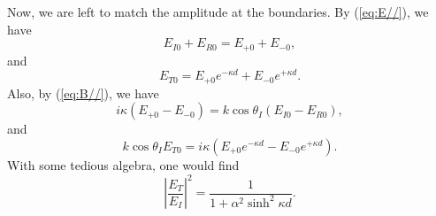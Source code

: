 Now, we are left to match the amplitude at the boundaries. By (\ref{eq:E//}), we have
\begin{equation}
    E_{I0} + E_{R0} = E_{+0} + E_{-0},
\end{equation}
and
\begin{equation}
    E_{T0} =E_{+0}e^{-\kappa d} + E_{-0}e^{+\kappa d}.
\end{equation}
Also, by (\ref{eq:B//}), we have
\begin{equation}
    i\kappa(E_{+0}-E_{-0}) = k\cos\theta_I(E_{I0}-E_{R0}),
\end{equation}
and
\begin{equation}
    k\cos\theta_IE_{T0} = i\kappa(E_{+0}e^{-\kappa d}-E_{-0}e^{+\kappa d}).
\end{equation}
With some tedious algebra, one would find
\begin{equation}
\left| \frac{E_T}{E_I} \right|^2 = \frac{1}{1 + \alpha^2 \sinh^2 \kappa d}.
\end{equation}









